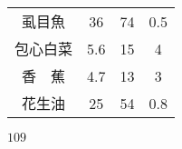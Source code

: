 \begin{QUESTIONS}
\begin{QUESTION}
\begin{QBODY}
\begin{tabular}{|c|c|c|c|}
        	虱目魚  &  36   &  74   &   0.5   \\ 
        	包心白菜 &  5.6  &  15   &    4    \\
        	香　蕉  &  4.7  &  13   &    3    \\ 
        	花生油  &  25   &  54   &   0.8   \\ \hline
        \end{tabular} 
        \end{QBODY}
        \begin{QFROMS}
        \end{QFROMS}
        \begin{QTAGS}\end{QTAGS}
        \begin{QANS}
            $109$
        \end{QANS}
        \begin{QSOLLIST}
        \end{QSOLLIST}
        \begin{QEMPTYSPACE}
        \end{QEMPTYSPACE}
    \end{QUESTION}
\end{QUESTIONS}